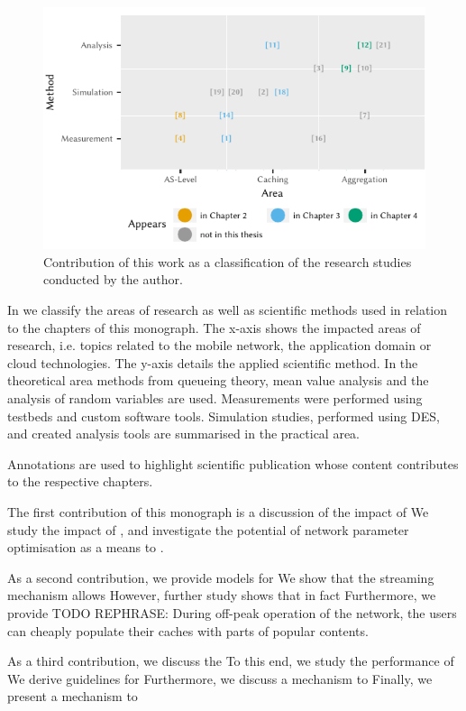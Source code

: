 \begin{figure}
\centering
\includegraphics{figures/publications}
\caption{Contribution of this work as a classification of the research studies conducted by the author.}\label{fig:introduction:publications}
\end{figure}

In  we classify the areas of research as well as scientific methods used in relation to the chapters of this monograph.
The x-axis shows the impacted areas of research, i.e. topics related to the mobile network, the application domain or cloud technologies.
The y-axis details the applied scientific method.
In the theoretical area methods from queueing theory, mean value analysis and the analysis of random variables are used.
Measurements were performed using testbeds and custom software tools.
Simulation studies, performed using \gls{DES}, and created analysis tools are summarised in the practical area.

Annotations are used to highlight scientific publication whose content contributes to the respective chapters.

The first contribution of this monograph is a discussion of the impact of
We study the impact of , and investigate the potential of network parameter optimisation as a means to .

As a second contribution, we provide models for
We show that the streaming mechanism allows
However, further study shows that in fact
Furthermore, we provide
TODO REPHRASE: During off-peak operation of the network, the users can cheaply populate their caches with parts of popular contents.

As a third contribution, we discuss the
To this end, we study the performance of
We derive guidelines for
Furthermore, we discuss a mechanism to
Finally, we present a mechanism to

